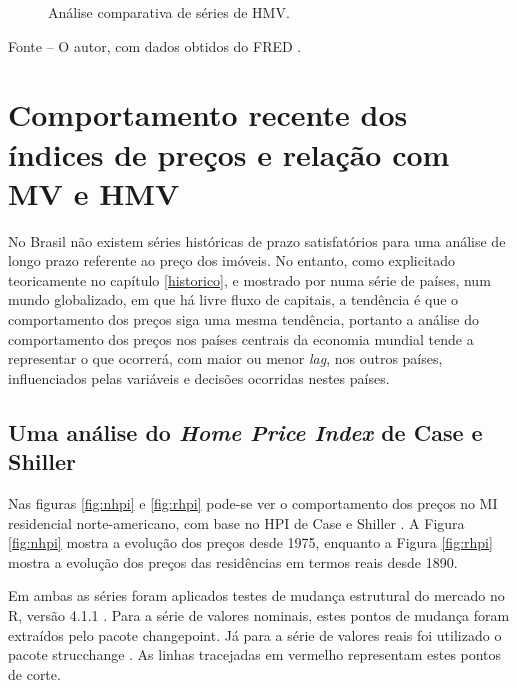\documentclass[
	12pt,				%
	oneside,			%
	a4paper,			%
	chapter=TITLE,		%
	section=TITLE,		%
	english,			%
	brazil				%
	]{abntex2}
\newcommand{\pkg}[1]{{\normalfont\fontseries{b}\selectfont #1}}
\let\proglang=\textsf
\newcommand{\bcenter}{\begin{center}}
\newcommand{\ecenter}{\end{center}}
\begin{document}
\begin{refsection}
\begin{figure}[H]
{}

\caption{Análise comparativa de séries de \gls{HMV}.}\label{fig:twoseries}
\end{figure}
\bcenter

\small Fonte -- O autor, com dados obtidos do FRED \autocite{RSAHORUSQ156S,CSUSHPINSA}.
\ecenter

\hypertarget{comportamento-recente-dos-uxedndices-de-preuxe7os-e-relauxe7uxe3o-com-e}{%
\section{\texorpdfstring{Comportamento recente dos índices de preços e relação com \gls{MV} e \gls{HMV}}{Comportamento recente dos índices de preços e relação com  e }}\label{comportamento-recente-dos-uxedndices-de-preuxe7os-e-relauxe7uxe3o-com-e}}

No Brasil não existem séries históricas de prazo satisfatórios para uma análise
de longo prazo referente ao preço dos imóveis. No entanto, como explicitado
teoricamente no capítulo \ref{historico}, e mostrado por \textcite{ADAMS2010} numa
série de países, num mundo globalizado, em que há livre fluxo de capitais, a
tendência é que o comportamento dos preços siga uma mesma tendência, portanto a
análise do comportamento dos preços nos países centrais da economia mundial
tende a representar o que ocorrerá, com maior ou menor \emph{lag}, nos outros países,
influenciados pelas variáveis e decisões ocorridas nestes países.

\hypertarget{uma-anuxe1lise-do-de-case-e-shiller}{%
\subsection{\texorpdfstring{Uma análise do \emph{Home Price Index} de Case e Shiller}{Uma análise do  de Case e Shiller}}\label{uma-anuxe1lise-do-de-case-e-shiller}}

Nas figuras \ref{fig:nhpi} e \ref{fig:rhpi} pode-se ver o comportamento dos
preços no \gls{MI} residencial norte-americano, com base no \gls{HPI} de Case e
Shiller \autocite{NBERw2506}. A Figura \ref{fig:nhpi} mostra a evolução dos preços
desde 1975, enquanto a Figura \ref{fig:rhpi} mostra a evolução dos preços
das residências em termos reais desde 1890.

Em ambas as séries foram aplicados testes de mudança estrutural do mercado no
\proglang{R}, versão 4.1.1 \autocite{R}.
Para a série de valores nominais, estes pontos de mudança foram extraídos pelo
pacote \pkg{changepoint}. Já para a série de valores reais foi utilizado o
pacote \pkg{strucchange} \autocite{strucchange}. As linhas tracejadas em vermelho representam estes
pontos de corte.
\begin{figure}[H]


\end{figure}
\end{refsection}
\end{document}
